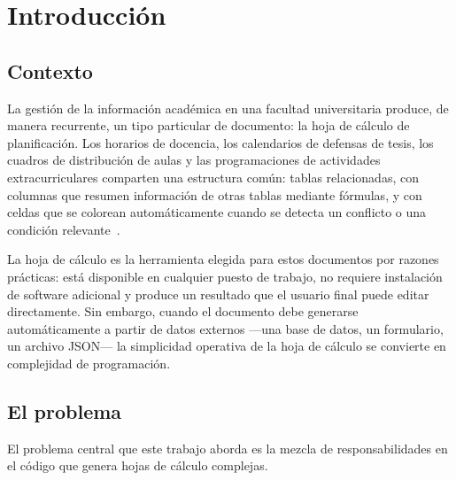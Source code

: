 \chapter*{Introducci\'on}
\label{cap:intro}

\section*{Contexto}

La gesti\'on de la informaci\'on acad\'emica en una facultad universitaria
produce, de manera recurrente, un tipo particular de documento: la hoja de
c\'alculo de planificaci\'on.  Los horarios de docencia, los calendarios de
defensas de tesis, los cuadros de distribuci\'on de aulas y las
programaciones de actividades extracurriculares comparten una estructura
com\'un: tablas relacionadas, con columnas que resumen informaci\'on de
otras tablas mediante f\'ormulas, y con celdas que se colorean
autom\'aticamente cuando se detecta un conflicto o una condici\'on
relevante~\cite{ldmag2025}.

La hoja de c\'alculo es la herramienta elegida para estos documentos por
razones pr\'acticas: est\'a disponible en cualquier puesto de trabajo, no
requiere instalaci\'on de software adicional y produce un resultado que el
usuario final puede editar directamente.  Sin embargo, cuando el documento
debe generarse autom\'aticamente a partir de datos externos ---una base de
datos, un formulario, un archivo JSON--- la simplicidad operativa de la hoja
de c\'alculo se convierte en complejidad de programaci\'on.

\section*{El problema}

El problema central que este trabajo aborda es la mezcla de responsabilidades
en el c\'odigo que genera hojas de c\'alculo complejas.

